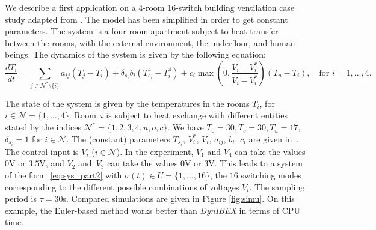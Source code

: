  We describe a first application on a 4-room 16-switch building ventilation case study adapted from
\cite{meyer:tel-01232640}. The model has been simplified in order to get constant
parameters.
The system is a four room apartment
subject to heat transfer between the rooms, with the external
environment, the underfloor, and human beings.  The dynamics
of the system is given by the following equation:
\begin{equation*}
 \frac{d T_i}{dt} = \sum_{j \in \mathcal{N}^\text{*} \setminus \{i\}} a_{ij} (T_j -
 T_i) + \delta_{s_i} b_i (T_{s_i}^4 - T_i ^4 )  + c_i
 \max\left(0,\frac{V_i - V_i^\text{*}}{\bar{ V_i} -
   V_i^{\text{*}}}\right)(T_u - T_i), \quad \mbox{for } i=1,...,4.
\end{equation*}

The state of the system is given by the temperatures in the rooms
$T_i$, for $i \in \mathcal{N} = \{ 1 , \dots , 4 \}$.  Room~$i$ is
subject to heat exchange with different entities stated by the indices
$\mathcal{N}^\text{*} = \{1,2,3,4,u,o,c \}$.
%
We have $T_0=30, T_c=30, T_u=17$, $\delta_{s_i}=1$ for $i\in\mathcal{N}$.
The (constant) parameters $T_{s_i}$, $V_i^\text{*}$, $\bar V_i$, $a_{ij}$, $b_i$,
$c_i$ are given in~\cite{meyer:tel-01232640}. 
%
The control input is $V_i$ ($i \in \mathcal{N}$).
In the experiment, $V_1$ and $V_4$ can take the values $0$V
or $3.5$V, and $V_2$ and~$V_3$ can take the values $0$V or $3$V. This
leads to a system of the form~\eqref{eq:sys_part2} with $\sigma(t) \in U =\{
1, \dots, 16 \}$, the $16$ switching modes corresponding to the
different possible combinations of voltages $V_i$.  
The sampling period is $\tau = 30$s.
Compared simulations are given in Figure \ref{fig:simu}.
On this example, the Euler-based method works better than {\em DynIBEX}
in terms of CPU time.



